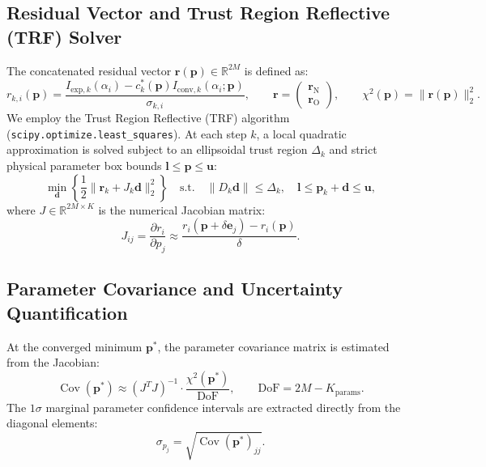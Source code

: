 \documentclass[11pt,a4paper]{article}
\newcommand{\Cov}{\operatorname{Cov}}
\newcommand{\DoF}{\mathrm{DoF}}
\begin{document}
\subsection{Residual Vector and Trust Region Reflective (TRF) Solver}
The concatenated residual vector $\mathbf{r}(\mathbf{p}) \in \mathbb{R}^{2M}$ is defined as:
\begin{equation}
    r_{k, i}(\mathbf{p}) = \frac{I_{\mathrm{exp}, k}(\alpha_i) - c_k^*(\mathbf{p}) I_{\mathrm{conv}, k}(\alpha_i; \mathbf{p})}{\sigma_{k, i}}, \qquad \mathbf{r} = \begin{pmatrix} \mathbf{r}_{\mathrm{N}} \\ \mathbf{r}_{\mathrm{O}} \end{pmatrix}, \qquad \chi^2(\mathbf{p}) = \|\mathbf{r}(\mathbf{p})\|_2^2.
\end{equation}
We employ the Trust Region Reflective (TRF) algorithm (\texttt{scipy.optimize.least\_squares}). At each step $k$, a local quadratic approximation is solved subject to an ellipsoidal trust region $\Delta_k$ and strict physical parameter box bounds $\mathbf{l} \le \mathbf{p} \le \mathbf{u}$:
\begin{equation}
    \min_{\mathbf{d}} \left\{ \frac{1}{2} \|\mathbf{r}_k + J_k \mathbf{d}\|_2^2 \right\} \quad \text{s.t.} \quad \|D_k \mathbf{d}\| \le \Delta_k, \quad \mathbf{l} \le \mathbf{p}_k + \mathbf{d} \le \mathbf{u},
\end{equation}
where $J \in \mathbb{R}^{2M \times K}$ is the numerical Jacobian matrix:
\begin{equation}
    J_{ij} = \frac{\partial r_i}{\partial p_j} \approx \frac{r_i(\mathbf{p} + \delta \mathbf{e}_j) - r_i(\mathbf{p})}{\delta}.
\end{equation}

\subsection{Parameter Covariance and Uncertainty Quantification}
At the converged minimum $\mathbf{p}^*$, the parameter covariance matrix is estimated from the Jacobian:
\begin{equation}
    \Cov(\mathbf{p}^*) \approx \left( J^T J \right)^{-1} \cdot \frac{\chi^2(\mathbf{p}^*)}{\DoF}, \qquad \DoF = 2M - K_{\mathrm{params}}.
\end{equation}
The $1\sigma$ marginal parameter confidence intervals are extracted directly from the diagonal elements:
\begin{equation}
    \sigma_{p_j} = \sqrt{\Cov(\mathbf{p}^*)_{jj}}.
\end{equation}
\end{document}
